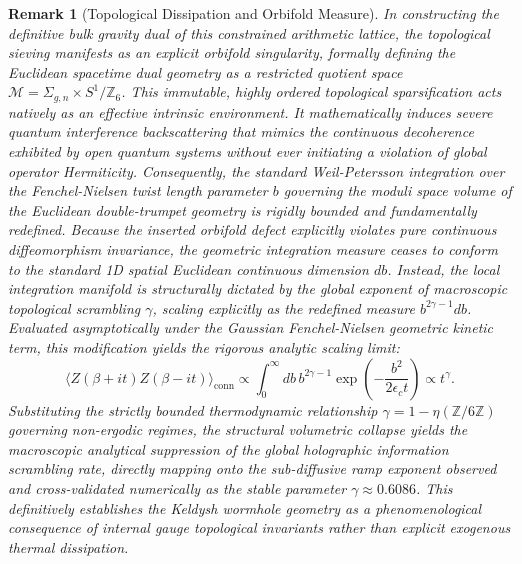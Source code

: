 \documentclass[aps,prl,preprint,superscriptaddress,floatfix]{revtex4-2}
\newtheorem{remark}[theorem]{Remark}
\newcommand{\Zmod}{\mathbb{Z}/6\mathbb{Z}}
\begin{document}
\begin{remark}[Topological Dissipation and Orbifold Measure]
\label{rem:keldysh}
In constructing the definitive bulk gravity dual of this constrained arithmetic lattice, the topological sieving manifests as an explicit orbifold singularity, formally defining the Euclidean spacetime dual geometry as a restricted quotient space $\mathcal{M} = \Sigma_{g,n} \times S^1 / \mathbb{Z}_6$.
This immutable, highly ordered topological sparsification acts natively as an effective intrinsic environment.
It mathematically induces severe quantum interference backscattering that mimics the continuous decoherence exhibited by open quantum systems without ever initiating a violation of global operator Hermiticity.
Consequently, the standard Weil-Petersson integration over the Fenchel-Nielsen twist length parameter $b$ governing the moduli space volume of the Euclidean double-trumpet geometry is rigidly bounded and fundamentally redefined.
Because the inserted orbifold defect explicitly violates pure continuous diffeomorphism invariance, the geometric integration measure ceases to conform to the standard 1D spatial Euclidean continuous dimension $db$.
Instead, the local integration manifold is structurally dictated by the global exponent of macroscopic topological scrambling $\gamma$, scaling explicitly as the redefined measure $b^{2\gamma - 1} db$. Evaluated asymptotically under the Gaussian Fenchel-Nielsen geometric kinetic term, this modification yields the rigorous analytic scaling limit:
\begin{equation}
\langle Z(\beta + it) Z(\beta - it) \rangle_{\text{conn}} \propto \int_0^\infty db \, b^{2\gamma-1} \exp\left(-\frac{b^2}{2 \epsilon_c t}\right) \propto t^{\gamma}.
\end{equation}
Substituting the strictly bounded thermodynamic relationship $\gamma = 1 - \eta(\Zmod)$ governing non-ergodic regimes, the structural volumetric collapse yields the macroscopic analytical suppression of the global holographic information scrambling rate, directly mapping onto the sub-diffusive ramp exponent observed and cross-validated numerically as the stable parameter $\gamma \approx 0.6086$.
This definitively establishes the Keldysh wormhole geometry as a phenomenological consequence of internal gauge topological invariants rather than explicit exogenous thermal dissipation.


\end{remark}
\end{document}
